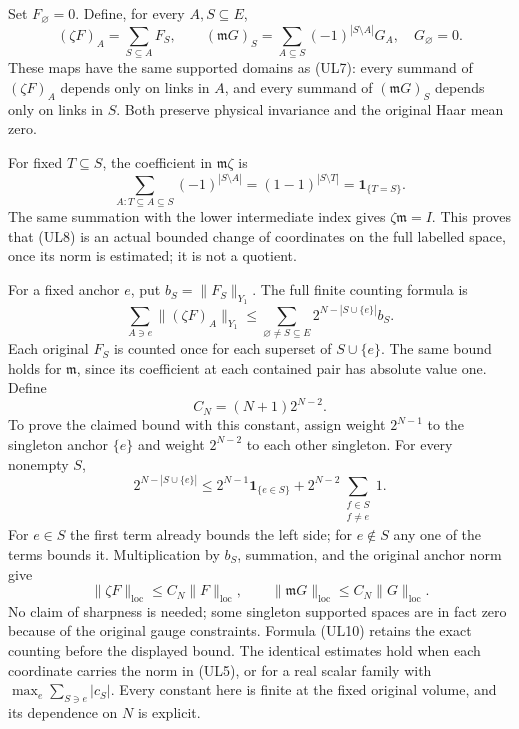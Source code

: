 \documentclass[11pt]{article}
\begin{document}
Set \(F_\varnothing=0\). Define, for every \(A,S\subseteq E\),
\[
 (\zeta F)_A=\sum_{S\subseteq A}F_S,\qquad
 (\mathfrak mG)_S=\sum_{A\subseteq S}(-1)^{|S\setminus A|}G_A,
 \quad G_\varnothing=0.
 \tag{UL8}
\]
These maps have the same supported domains as (UL7): every summand of \((\zeta F)_A\) depends only on links in \(A\), and every summand of \((\mathfrak mG)_S\) depends only on links in \(S\). Both preserve physical invariance and the original Haar mean zero.

For fixed \(T\subseteq S\), the coefficient in \(\mathfrak m\zeta\) is
\[
 \sum_{A:T\subseteq A\subseteq S}(-1)^{|S\setminus A|}
 =(1-1)^{|S\setminus T|}
 =\mathbf1_{\{T=S\}}.
 \tag{UL9}
\]
The same summation with the lower intermediate index gives \(\zeta\mathfrak m=I\). This proves that (UL8) is an actual bounded change of coordinates on the full labelled space, once its norm is estimated; it is not a quotient.

For a fixed anchor \(e\), put \(b_S=\|F_S\|_{Y_1}\). The full finite counting formula is
\[
 \sum_{A\ni e}\|(\zeta F)_A\|_{Y_1}
 \le\sum_{\varnothing\ne S\subseteq E}
        2^{N-|S\cup\{e\}|}b_S.
 \tag{UL10}
\]
Each original \(F_S\) is counted once for each superset of \(S\cup\{e\}\). The same bound holds for \(\mathfrak m\), since its coefficient at each contained pair has absolute value one. Define
\[
 C_N=(N+1)2^{N-2}.
 \tag{UL11}
\]
To prove the claimed bound with this constant, assign weight \(2^{N-1}\) to the singleton anchor \(\{e\}\) and weight \(2^{N-2}\) to each other singleton. For every nonempty \(S\),
\[
 2^{N-|S\cup\{e\}|}
 \le 2^{N-1}\mathbf1_{\{e\in S\}}
       +2^{N-2}\sum_{\substack{f\in S\\f\ne e}}1.
\]
For \(e\in S\) the first term already bounds the left side; for \(e\notin S\) any one of the terms bounds it. Multiplication by \(b_S\), summation, and the original anchor norm give
\[
 \boxed{\|\zeta F\|_{\mathrm{loc}}\le C_N\|F\|_{\mathrm{loc}},\qquad
        \|\mathfrak mG\|_{\mathrm{loc}}\le C_N\|G\|_{\mathrm{loc}}.}
 \tag{UL12}
\]
No claim of sharpness is needed; some singleton supported spaces are in fact zero because of the original gauge constraints. Formula (UL10) retains the exact counting before the displayed bound. The identical estimates hold when each coordinate carries the norm in (UL5), or for a real scalar family with \(\max_e\sum_{S\ni e}|c_S|\). Every constant here is finite at the fixed original volume, and its dependence on \(N\) is explicit.
\end{document}
